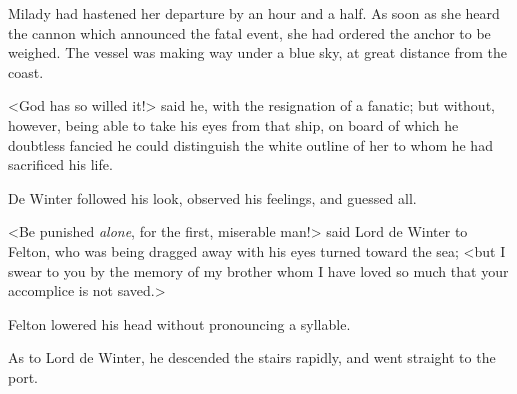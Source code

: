 Milady had hastened her departure by an hour and a half. As soon as she heard the cannon which announced the fatal event, she had ordered the anchor to be weighed. The vessel was making way under a blue sky, at great distance from the coast. 

<God has so willed it!> said he, with the resignation of a fanatic; but without, however, being able to take his eyes from that ship, on board of which he doubtless fancied he could distinguish the white outline of her to whom he had sacrificed his life. 

De Winter followed his look, observed his feelings, and guessed all. 

<Be punished \emph{alone}, for the first, miserable man!> said Lord de Winter to Felton, who was being dragged away with his eyes turned toward the sea; <but I swear to you by the memory of my brother whom I have loved so much that your accomplice is not saved.> 

Felton lowered his head without pronouncing a syllable. 

As to Lord de Winter, he descended the stairs rapidly, and went straight to the port. 